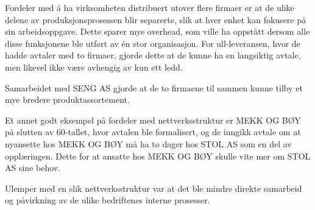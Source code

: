 Fordeler med å ha virksomheten distribuert utover flere firmaer er at de ulike delene av produksjonsprosessen blir separerte, slik at hver enhet kan fokusere på sin arbeidsoppgave.
Dette sparer mye overhead, som ville ha oppstått dersom alle disse funksjonene ble utført av én stor organisasjon.
For ull-leveransen, hvor de hadde avtaler med to firmaer, gjorde dette at de kunne ha en langsiktig avtale, men likevel ikke være avhengig av kun ett ledd.

Samarbeidet med SENG AS gjorde at de to firmaene til sammen kunne tilby et mye bredere produktassortement.

Et annet godt eksempel på fordeler med nettverksstruktur er MEKK OG BØY på slutten av 60-tallet, hvor avtalen ble formalisert, og de inngikk avtale om at nyansette hos MEKK OG BØY må ha to dager hos STOL AS som en del av opplæringen.
Dette for at ansatte hos MEKK OG BØY skulle vite mer om STOL AS sine behov.

Ulemper med en slik nettverksstruktur var at det ble mindre direkte samarbeid og påvirkning av de ulike bedriftenes interne prosesser.
